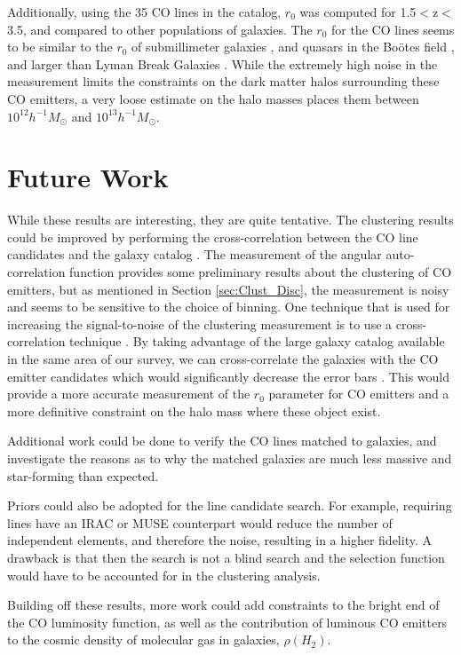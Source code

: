 \documentclass[twoside,single]{lion-msc}
\begin{document}
Additionally, using the 35 CO lines in the catalog, $r_0$ was computed for 1.5$<$z$<$3.5, and compared to other populations of galaxies. The $r_0$ for the CO lines seems to be similar to the $r_0$ of submillimeter galaxies \cite{10.1111/j.1365-2966.2011.20303.x}, and quasars in the Bo\"otes field \cite{hickox2011clustering}, and larger than Lyman Break Galaxies \cite{adelberger2005spatial}. While the extremely high noise in the measurement limits the constraints on the dark matter halos surrounding these CO emitters, a very loose estimate on the halo masses places them between $10^{12} h^{-1}M_{\odot}$ and $10^{13} h^{-1}M_{\odot}$.

\section{Future Work}\label{sec:Future_Work}

While these results are interesting, they are quite tentative. The clustering results could be improved by performing the cross-correlation between the CO line candidates and the galaxy catalog \cite{hickox2011clustering, 10.1111/j.1365-2966.2011.20303.x, 10.1111/j.1365-2966.2008.14071.x}. The measurement of the angular auto-correlation function provides some preliminary results about the clustering of CO emitters, but as mentioned in Section \ref{sec:Clust_Disc}, the measurement is noisy and seems to be sensitive to the choice of binning. One technique that is used for increasing the signal-to-noise of the clustering measurement is to use a cross-correlation technique \cite{hickox2011clustering, 10.1111/j.1365-2966.2011.20303.x}. By taking advantage of the large galaxy catalog available in the same area of our survey, we can cross-correlate the galaxies with the CO emitter candidates which would significantly decrease the error bars \cite{hickox2011clustering}. This would provide a more accurate measurement of the $r_0$ parameter for CO emitters and a more definitive constraint on the halo mass where these object exist.

Additional work could be done to verify the CO lines matched to galaxies, and investigate the reasons as to why the matched galaxies are much less massive and star-forming than expected.

Priors could also be adopted for the line candidate search. For example, requiring lines have an IRAC or MUSE counterpart would reduce the number of independent elements, and therefore the noise, resulting in a higher fidelity. A drawback is that then the search is not a blind search and the selection function would have to be accounted for in the clustering analysis.

Building off these results, more work could add constraints to the bright end of the CO luminosity function, as well as the contribution of luminous CO emitters to the cosmic density of molecular gas in galaxies, $\rho(H_2)$.



\appendix


\renewcommand\bibname{References}


\end{document}
